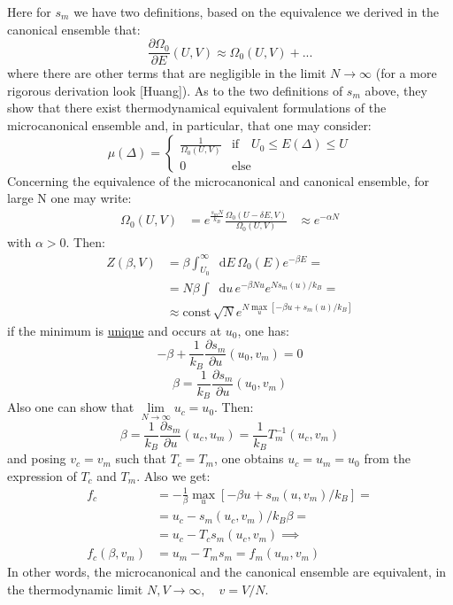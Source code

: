 \documentclass{article}
\newcommand*\diff{\mathop{}\!\mathrm{d}}
\begin{document}
Here for $s_m$ we have two definitions, based on the equivalence we derived in the canonical ensemble that:
$$ \frac{\partial \Omega_0 }{\partial E} (U,V) \approx \Omega_0 (U,V) +...$$
where there are other terms that are negligible in the limit $N \xrightarrow{} \infty$ (for a more rigorous derivation look [Huang]). As to the two definitions of $s_m $ above, they show that there exist thermodynamical equivalent formulations of the microcanonical ensemble and, in particular, that one may consider:
$$\mu(\Delta) = \begin{cases} \frac{1}{\Omega_0(U,V)} & \mathrm{if} \quad U_0 \leq E(\Delta) \leq U \\ 0 & \mathrm{else}  \end{cases} $$
Concerning the equivalence of the microcanonical and canonical ensemble, for large N one may write:
\begin{equation*}
    \begin{aligned}
    \Omega_0(U,V) &= e^{\frac{s_m N}{k_B}}
    \frac{\Omega_0 (U-\delta E,V)}{\Omega_0(U,V)} &\approx e^{-\alpha N}
    \end{aligned}
\end{equation*}
with $\alpha > 0$. Then:
\begin{equation*}
    \begin{aligned}
    Z(\beta,V) &= \beta \int_{U_0}^\infty \diff{E}\, \Omega_0(E) e^{-\beta E} =\\
    &= N\beta \int\diff{u} \, e^{-\beta N u}e^{Ns_m(u)/k_B} =\\
    &\approx \mathrm{const}\, \sqrt{N} e^{N \max\limits_{u}[-\beta u +s_m(u)/k_B] }
    \end{aligned}
\end{equation*}
if the minimum is \underline{unique} and occurs at $u_0$, one has:
$$-\beta + \frac{1}{k_B} \frac{\partial s_m}{\partial u} (u_0,v_m) = 0$$
$$\beta = \frac{1}{k_B} \frac{\partial s_m}{\partial u} (u_0,v_m)$$
Also one can show that $\lim \limits_{N\xrightarrow{} \infty} u_c = u_0$. Then:
$$\beta = \frac{1}{k_B} \frac{\partial s_m}{\partial u} (u_c,u_m) = \frac{1}{k_B} T_m^{-1} (u_c,v_m)$$
and posing $v_c =v_m$ such that $T_c = T_m$, one obtains $u_c = u_m = u_0$ from the expression of $T_c$ and $T_m$. Also we get:
\begin{equation*}
\begin{aligned}
    f_c &= -\frac{1}{\beta} \max \limits_u [-\beta u + s_m(u,v_m)/k_B] =\\
    &= u_c - s_m(u_c,v_m)/k_B \beta =\\
    &= u_c -T_c s_m(u_c,v_m) \implies\\
    f_c(\beta,v_m) &= u_m -T_m s_m = f_m(u_m,v_m)
\end{aligned}    
\end{equation*}
In other words, the microcanonical and the canonical ensemble are equivalent, in the thermodynamic limit $N,V \xrightarrow{} \infty, \quad v = V/N$.
\end{document}
